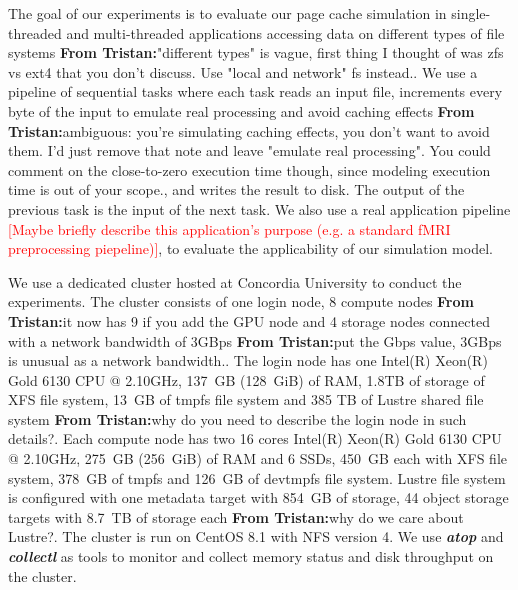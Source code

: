 \documentclass[conference]{IEEEtran}
\newcommand{\tristan}[1]{\color{orange}\textbf{From Tristan:}#1\color{black}}
\begin{document}
            The goal of our experiments is to evaluate our page cache 
            simulation in single-threaded and multi-threaded applications
            accessing data on different types of file systems \tristan{"different types" is vague, first thing I thought of was zfs vs ext4 that you don't discuss. Use "local and network" fs instead.}. 
            We use a pipeline
            of sequential tasks where each task reads an input file, increments
            every byte of the input to emulate real processing and avoid caching
            effects \tristan{ambiguous: you're simulating caching effects, you don't want to avoid them. I'd just remove that note and leave "emulate real processing". You could comment on 
            the close-to-zero execution time though, since modeling execution time is out of your scope.}, and writes the result to disk. The output of the previous
            task is the input of the next task. We also use a real application 
            pipeline \textcolor{red}{[Maybe briefly describe this application's purpose (e.g. a standard fMRI preprocessing piepeline)]}, to evaluate the applicability of our simulation model. 
            
            We use a dedicated cluster hosted at Concordia University to conduct 
            the experiments. The cluster consists of one login node, 8 compute nodes \tristan{it now has 9 if you add the GPU node}
            and 4 storage nodes connected with a network bandwidth of 3GBps \tristan{put the Gbps value, 3GBps is unusual as a network bandwidth.}. 
            The login node has one Intel(R) Xeon(R) Gold 6130 CPU @ 2.10GHz, 
            137~GB (128~GiB) of RAM, 1.8TB of storage of XFS file system, 
            13~GB of tmpfs file system and 385 TB of Lustre shared file system \tristan{why do you need to describe the login node in such details?}. 
            Each compute node has two 16 cores Intel(R) Xeon(R) Gold 6130 CPU @ 2.10GHz, 
            275~GB (256~GiB) of RAM and 6 SSDs, 450~GB each with XFS file system, 
            378~GB of tmpfs and 126~GB of devtmpfs file system.
            Lustre file system is configured with one metadata target with 854~GB 
            of storage, 44 object storage targets with 8.7~TB of storage each \tristan{why do we care about Lustre?}. 
            The cluster is run on CentOS 8.1 with NFS version 4. 
            We use \textbf{\textit{atop}} and \textbf{\textit{collectl}} as tools to 
            monitor and collect memory status and disk throughput 
            on the cluster. 
            
\end{document}
